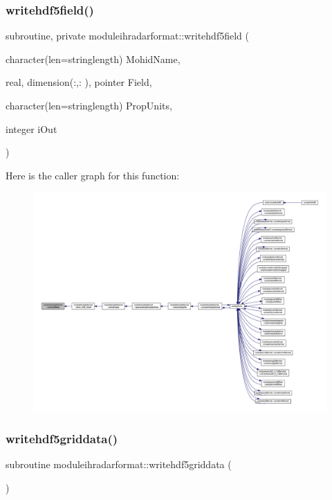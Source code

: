 \subsubsection{\texorpdfstring{writehdf5field()}{writehdf5field()}}
{\footnotesize\ttfamily subroutine, private moduleihradarformat\+::writehdf5field (\begin{DoxyParamCaption}\item[{character(len=stringlength)}]{Mohid\+Name,  }\item[{real, dimension(\+:,\+:  ), pointer}]{Field,  }\item[{character(len=stringlength)}]{Prop\+Units,  }\item[{integer}]{i\+Out }\end{DoxyParamCaption})\hspace{0.3cm}{\ttfamily [private]}}

Here is the caller graph for this function\+:\nopagebreak
\begin{figure}[H]
\begin{center}
\leavevmode
\includegraphics[width=350pt]{namespacemoduleihradarformat_a77312b34323d0e8aa7466fdfc0f8a35e_icgraph}
\end{center}
\end{figure}
\mbox{\label{namespacemoduleihradarformat_aded21feba733b9d42beced7d5846c854}} 
\subsubsection{\texorpdfstring{writehdf5griddata()}{writehdf5griddata()}}
{\footnotesize\ttfamily subroutine moduleihradarformat\+::writehdf5griddata (\begin{DoxyParamCaption}{ }\end{DoxyParamCaption})\hspace{0.3cm}{\ttfamily [private]}}

